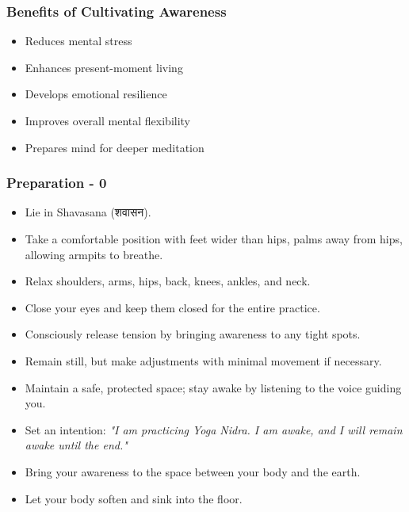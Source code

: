 \begin{frame}[fragile]\frametitle{Benefits of Cultivating Awareness}
    \begin{itemize}
        \item Reduces mental stress
        \item Enhances present-moment living
        \item Develops emotional resilience
        \item Improves overall mental flexibility
        \item Prepares mind for deeper meditation
    \end{itemize}
\end{frame}



\begin{frame}[fragile]\frametitle{Preparation - 0}
    \begin{itemize}
        \item Lie in Shavasana (शवासन).
        \item Take a comfortable position with feet wider than hips, palms away from hips, allowing armpits to breathe.
        \item Relax shoulders, arms, hips, back, knees, ankles, and neck.
        \item Close your eyes and keep them closed for the entire practice.
        \item Consciously release tension by bringing awareness to any tight spots.
        \item Remain still, but make adjustments with minimal movement if necessary.
        \item Maintain a safe, protected space; stay awake by listening to the voice guiding you.
        \item Set an intention: \textit{"I am practicing Yoga Nidra. I am awake, and I will remain awake until the end."}
        \item Bring your awareness to the space between your body and the earth.
        \item Let your body soften and sink into the floor.    
	\end{itemize}
	
\end{frame}

